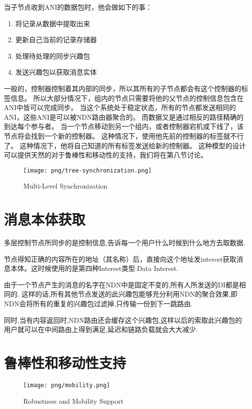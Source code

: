 当子节点收到ANI的数据包时，他会做如下的事：
\begin{enumerate}
  \item 将记录从数据中提取出来
  \item 更新自己当前的记录存储器
  \item 处理待处理的同步兴趣包
  \item 发送兴趣包以获取消息实体
\end{enumerate}

一般的，控制器控制着其内部的同步，所以其所有的子节点都会有这个控制器的标签信息。
所以大部分情况下，组内的节点只需要将他的父节点的控制信息包含在ANI中皆可以完成同步。
当这个系统处于稳定状态，所有的节点都发送相同的ANI，这些ANI是可以被NDN路由器聚合的。
而数据又是通过相反的路径精确的到达每个参与者。
当一个节点移动到另一个组内，或者控制器宕机或下线了，该节点将会找到一个新的控制器。
这种情况下，使用他先前的控制器的标签就不行了。
这种情况下，他将自己知道的所有标签发送给新的控制器。
这种模型的设计可以提供天然的对于鲁棒性和移动性的支持，我们将在第八节讨论。

\begin{figure}
\centering
\texttt{[image: png/tree-synchronization.png]}
\caption{Multi-Level Synchronization}
\label{tree_synchronization}
\end{figure}

\section{消息本体获取}

多层控制节点所同步的是控制信息,告诉每一个用户什么时候到什么地方去取数据.

节点得知正确的内容所在的地址（其名称）后，直接向这个地址发interest获取消息本体。这时候使用的是第四种Interest类型:Data Interest.

由于一个节点产生的消息的名字在NDN中是固定不变的,所有人所发送的DI都是相同的.
这样的话,所有其他节点发送的此兴趣包能够充分利用NDN的聚合效果,即NDN会将所有的重复的兴趣包过滤掉,只传输一份到下一跳路由.

同时,当有内容返回时,NDN路由还会缓存这个兴趣包,这样以后的索取此兴趣包的用户就可以在中间路由上得到满足,延迟和链路负载就会大大减少.

\section{鲁棒性和移动性支持}

\begin{figure}
\centering
\texttt{[image: png/mobility.png]}
\caption{Robustness and Mobility Support}
\label{mobility_pic}
\end{figure}

